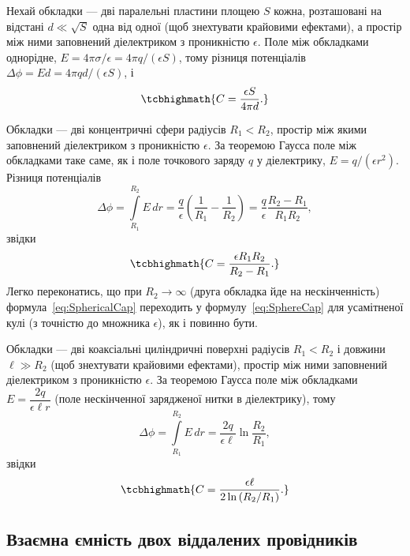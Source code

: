  Нехай обкладки --- дві паралельні пластини площею $S$ кожна, розташовані на відстані $d \ll \sqrt{S}$ одна від одної
(щоб знехтувати крайовими ефектами), а простір між ними заповнений діелектриком з проникністю $\epsilon$. Поле між обкладками однорідне,
$E = 4\pi\sigma/\epsilon = 4\pi q /(\epsilon S)$, тому різниця потенціалів $\Delta\phi = Ed = 4\pi qd/(\epsilon S)$, і
\begin{equation}\label{eq:FlatCap}
	\tcbhighmath{
		C = \frac{\epsilon S}{4\pi d}.
	}
\end{equation}

 Обкладки --- дві концентричні сфери радіусів $R_1 < R_2$, простір між якими заповнений діелектриком з проникністю
$\epsilon$. За теоремою Гаусса поле між обкладками таке саме, як і поле точкового заряду $q$ у діелектрику, $E = q/(\epsilon r^2)$. Різниця
потенціалів
\begin{equation*}
	\Delta\phi = \int\limits_{R_1}^{R_2} E\, dr = \frac{q}{\epsilon}\left(\frac1{R_1} - \frac1{R_2}\right) = \frac{q}{\epsilon}\frac{R_2 - R_1}{R_1
		R_2},
\end{equation*}
звідки
\begin{equation}\label{eq:SphericalCap}
	\tcbhighmath{
		C = \frac{\epsilon R_1 R_2}{R_2 - R_1}.
	}
\end{equation}
Легко переконатись, що при $R_2 \to \infty$ (друга обкладка йде на нескінченність) формула~\eqref{eq:SphericalCap} переходить у
формулу~\eqref{eq:SphereCap} для усамітненої кулі (з точністю до множника $\epsilon$), як і повинно бути.

 Обкладки --- дві коаксіальні циліндричні поверхні радіусів $R_1 < R_2$ і довжини $\ell \gg R_2$ (щоб знехтувати
крайовими ефектами), простір між ними заповнений діелектриком з проникністю $\epsilon$. За теоремою Гаусса поле між обкладками
$E = \dfrac{2q}{\epsilon \ell r}$ (поле нескінченної зарядженої нитки в діелектрику), тому
\begin{equation*}
	\Delta\phi = \int\limits_{R_1}^{R_2} E\, dr = \frac{2q}{\epsilon\ell}\ln\frac{R_2}{R_1},
\end{equation*}
звідки
\begin{equation}\label{eq:CylindricalCap}
	\tcbhighmath{
		C = \frac{\epsilon \ell}{2\ln\left(R_2/R_1\right)}.
	}
\end{equation}

\subsection*{Взаємна ємність двох віддалених провідників}

